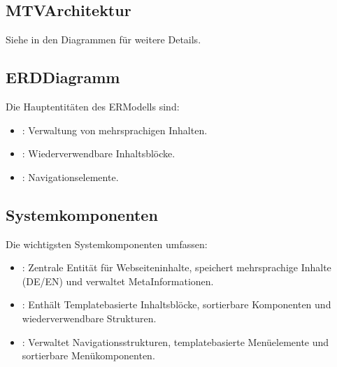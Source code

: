 \documentclass[a4paper,12pt,ngerman]{sphinxmanual}
\begin{document}
\subsection{MTV\sphinxhyphen{}Architektur}
\label{\detokenize{sections/entwurf:mtv-architektur}}
\sphinxAtStartPar
Siehe {\hyperref[\detokenize{sections/diagramme:mtv-architecture}]{}} in den Diagrammen für weitere Details.


\subsection{ERD\sphinxhyphen{}Diagramm}
\label{\detokenize{sections/entwurf:erd-diagramm}}
\sphinxAtStartPar
Die Hauptentitäten des ER\sphinxhyphen{}Modells sind:
\begin{itemize}
\item {} 
\sphinxAtStartPar
{}: Verwaltung von mehrsprachigen Inhalten.

\item {} 
\sphinxAtStartPar
{}: Wiederverwendbare Inhaltsblöcke.

\item {} 
\sphinxAtStartPar
{}: Navigationselemente.

\end{itemize}


\subsection{Systemkomponenten}
\label{\detokenize{sections/entwurf:systemkomponenten}}
\sphinxAtStartPar
Die wichtigsten Systemkomponenten umfassen:
\begin{itemize}
\item {} 
\sphinxAtStartPar
{}: Zentrale Entität für Webseiteninhalte, speichert mehrsprachige Inhalte (DE/EN) und verwaltet Meta\sphinxhyphen{}Informationen.

\item {} 
\sphinxAtStartPar
{}: Enthält Template\sphinxhyphen{}basierte Inhaltsblöcke, sortierbare Komponenten und wiederverwendbare Strukturen.

\item {} 
\sphinxAtStartPar
{}: Verwaltet Navigationsstrukturen, template\sphinxhyphen{}basierte Menüelemente und sortierbare Menükomponenten.

\end{itemize}
\end{document}
